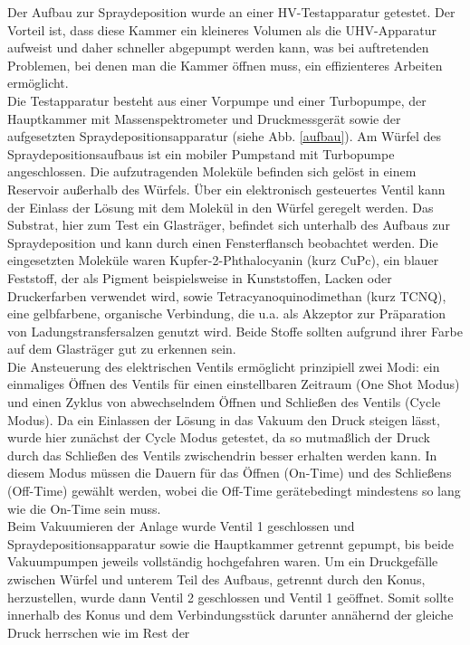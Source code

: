Der Aufbau zur Spraydeposition wurde an einer HV-Testapparatur getestet. Der
Vorteil ist, dass diese Kammer ein kleineres Volumen als die UHV-Apparatur aufweist und daher
schneller abgepumpt werden kann, was bei auftretenden Problemen, bei denen man die Kammer öffnen
muss, ein effizienteres Arbeiten ermöglicht.
\\
Die Testapparatur besteht aus einer Vorpumpe und  einer Turbopumpe,
der Hauptkammer mit Massenspektrometer und Druckmessgerät sowie der aufgesetzten
Spraydepositionsapparatur (siehe Abb. \ref{aufbau}). Am Würfel des Spraydepositionsaufbaus ist ein
mobiler Pumpstand mit Turbopumpe angeschlossen.
Die aufzutragenden Moleküle befinden sich gelöst in einem Reservoir außerhalb des Würfels. Über ein
elektronisch gesteuertes Ventil kann der Einlass der Lösung mit dem Molekül in den Würfel geregelt
werden. Das Substrat, hier zum Test ein Glasträger, befindet sich unterhalb des Aufbaus zur
Spraydeposition und kann durch einen Fensterflansch beobachtet werden. Die eingesetzten Moleküle
waren Kupfer-2-Phthalocyanin (kurz CuPc), ein blauer Feststoff, der als Pigment beispielsweise in
Kunststoffen, Lacken oder Druckerfarben verwendet wird, sowie 
Tetracyanoquinodimethan (kurz TCNQ), eine gelbfarbene,
organische Verbindung, die u.a. als Akzeptor zur Präparation von Ladungstransfersalzen genutzt wird.
Beide Stoffe sollten aufgrund ihrer Farbe auf dem Glasträger gut zu erkennen sein. 
\\
Die Ansteuerung des elektrischen Ventils ermöglicht prinzipiell zwei Modi: ein einmaliges Öffnen des
Ventils für einen einstellbaren Zeitraum (One Shot Modus) und einen Zyklus von abwechselndem
Öffnen und Schließen des Ventils (Cycle Modus). Da ein Einlassen der Lösung in das Vakuum
den Druck steigen lässt, wurde hier zunächst der Cycle Modus getestet, da so mutmaßlich der Druck
durch das Schließen des Ventils zwischendrin besser erhalten werden kann. In diesem Modus müssen
die Dauern für das Öffnen (On-Time) und des Schließens (Off-Time) gewählt werden, wobei die Off-Time
gerätebedingt mindestens so lang wie die On-Time sein muss.
\\
Beim Vakuumieren der Anlage wurde Ventil 1  geschlossen und Spraydepositionsapparatur sowie die 
 Hauptkammer getrennt gepumpt, bis beide Vakuumpumpen jeweils vollständig hochgefahren
 waren. Um ein Druckgefälle zwischen Würfel und unterem Teil des Aufbaus, getrennt
 durch den Konus, herzustellen, wurde dann Ventil 2 geschlossen und Ventil 1 geöffnet. Somit sollte
 innerhalb des Konus und dem Verbindungsstück darunter annähernd der gleiche Druck herrschen wie im Rest der
